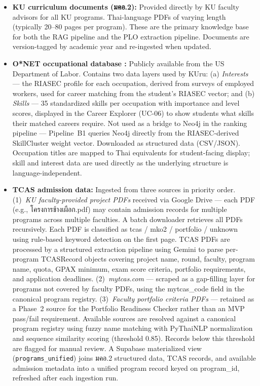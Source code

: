 \begin{itemize}[leftmargin=80pt]
    \item \textbf{KU curriculum documents (มคอ.2):} Provided directly by KU faculty advisors for all KU programs. Thai-language PDFs of varying length (typically 20--80 pages per program). These are the primary knowledge base for both the RAG pipeline and the PLO extraction pipeline. Documents are version-tagged by academic year and re-ingested when updated.

    \item \textbf{O*NET occupational database \cite{onet2024}:} Publicly available from the US Department of Labor. Contains two data layers used by KUru: (a) \textit{Interests} --- the RIASEC profile for each occupation, derived from surveys of employed workers, used for career matching from the student's RIASEC vector; and (b) \textit{Skills} --- 35 standardized skills per occupation with importance and level scores, displayed in the Career Explorer (UC-06) to show students what skills their matched careers require. Not used as a bridge to Neo4j in the ranking pipeline --- Pipeline~B1 queries Neo4j directly from the RIASEC-derived SkillCluster weight vector. Downloaded as structured data (CSV/JSON). Occupation titles are mapped to Thai equivalents for student-facing display; skill and interest data are used directly as the underlying structure is language-independent.

    \item \textbf{TCAS admission data:} Ingested from three sources in priority order. (1)~\textit{KU faculty-provided project PDFs} received via Google Drive --- each PDF (e.g., โครงการช้างเผือก.pdf) may contain admission records for multiple programs across multiple faculties. A batch downloader retrieves all PDFs recursively. Each PDF is classified as tcas / mko2 / portfolio / unknown using rule-based keyword detection on the first page. TCAS PDFs are processed by a structured extraction pipeline using Gemini to parse per-program TCASRecord objects covering project name, round, faculty, program name, quota, GPAX minimum, exam score criteria, portfolio requirements, and application deadlines. (2)~\textit{mytcas.com} --- scraped as a gap-filling layer for programs not covered by faculty PDFs, using the mytcas\_code field in the canonical program registry. (3)~\textit{Faculty portfolio criteria PDFs} --- retained as a Phase~2 source for the Portfolio Readiness Checker rather than an MVP pass/fail requirement. Available sources are resolved against a canonical program registry using fuzzy name matching with PyThaiNLP normalization and sequence similarity scoring (threshold 0.85). Records below this threshold are flagged for manual review. A Supabase materialized view (\texttt{programs\_unified}) joins มคอ.2 structured data, TCAS records, and available admission metadata into a unified program record keyed on program\_id, refreshed after each ingestion run.


\end{itemize}
